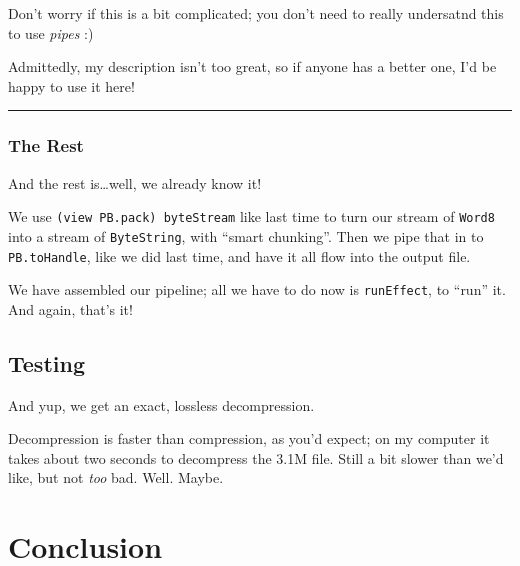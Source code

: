 \documentclass[]{article}
\newenvironment{Shaded}{}{}
\newcommand{\KeywordTok}[1]{\textcolor[rgb]{0.00,0.44,0.13}{\textbf{{#1}}}}
\newcommand{\CommentTok}[1]{\textcolor[rgb]{0.38,0.63,0.69}{\textit{{#1}}}}
\newcommand{\NormalTok}[1]{{#1}}
\begin{document}
Don't worry if this is a bit complicated; you don't need to really
undersatnd this to use \emph{pipes} :)

Admittedly, my description isn't too great, so if anyone has a better
one, I'd be happy to use it here!

\begin{center}\rule{0.5\linewidth}{\linethickness}\end{center}

\subsubsection{The Rest}\label{the-rest}

And the rest is\ldots{}well, we already know it!

We use \texttt{(view\ PB.pack)\ byteStream} like last time to turn our
stream of \texttt{Word8} into a stream of \texttt{ByteString}, with
``smart chunking''. Then we pipe that in to \texttt{PB.toHandle}, like
we did last time, and have it all flow into the output file.

We have assembled our pipeline; all we have to do now is
\texttt{runEffect}, to ``run'' it. And again, that's it!

\subsection{Testing}\label{testing}

\begin{Shaded}
\end{Shaded}

And yup, we get an exact, lossless decompression.

Decompression is faster than compression, as you'd expect; on my
computer it takes about two seconds to decompress the 3.1M file. Still a
bit slower than we'd like, but not \emph{too} bad. Well. Maybe.

\section{Conclusion}\label{conclusion}
\end{document}
